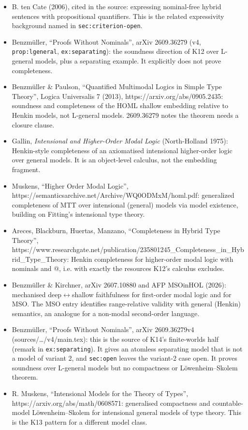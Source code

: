 \documentclass{article}
\begin{document}
\begin{itemize}
\item B. ten Cate (2006), cited in the source: expressing nominal-free hybrid sentences with propositional quantifiers. This is the related expressivity background named in \texttt{sec:criterion-open}.
\item Benzmüller, ``Proofs Without Nominals'', arXiv 2609.36279 (v4, \texttt{prop:lgeneral}, \texttt{ex:separating}): the soundness direction of K12 over L-general models, plus a separating example. It explicitly does not prove completeness.
\item Benzmüller \& Paulson, ``Quantified Multimodal Logics in Simple Type Theory'', Logica Universalis 7 (2013), https://arxiv.org/abs/0905.2435: soundness and completeness of the HOML shallow embedding relative to Henkin models, not L-general models. 2609.36279 notes the theorem needs a closure clause.
\item Gallin, \emph{Intensional and Higher-Order Modal Logic} (North-Holland 1975): Henkin-style completeness of an axiomatised intensional higher-order logic over general models. It is an object-level calculus, not the embedding fragment.
\item Muskens, ``Higher Order Modal Logic'', https://semanticsarchive.net/Archive/WQ0ODMxM/homl.pdf: generalized completeness of MTT over intensional (general) models via model existence, building on Fitting's intensional type theory.
\item Areces, Blackburn, Huertas, Manzano, ``Completeness in Hybrid Type Theory'', https://www.researchgate.net/publication/235801245\_Completeness\_in\_Hybrid\_Type\_Theory: Henkin completeness for higher-order modal logic with nominals and @, i.e. with exactly the resources K12's calculus excludes.
\item Benzmüller \& Kirchner, arXiv 2607.10880 and AFP MSOinHOL (2026): mechanised deep$\leftrightarrow$shallow faithfulness for first-order modal logic and for MSO. The MSO entry identifies range-relative validity with general (Henkin) semantics, an analogue for a non-modal second-order language.
\item Benzmüller, ``Proofs Without Nominals'', arXiv 2609.36279v4 (sources/\ldots{}/v4/main.tex): this is the source of K14's finite-worlds half (remark in \texttt{ex:separating}). It gives an atomless separating model that is not a model of variant 2, and \texttt{sec:open} leaves the variant-2 case open. It proves soundness over L-general models but no compactness or Löwenheim--Skolem theorem.
\item R. Muskens, ``Intensional Models for the Theory of Types'', https://arxiv.org/abs/math/0608571: generalised compactness and countable-model Löwenheim--Skolem for intensional general models of type theory. This is the K13 pattern for a different model class.

\end{itemize}
\end{document}

